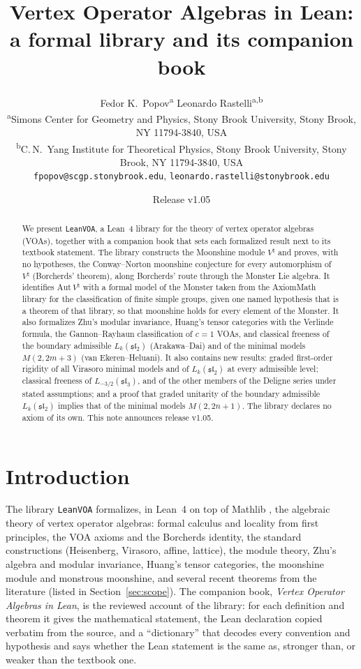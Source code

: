 \documentclass[10pt]{article}
\title{Vertex Operator Algebras in Lean:\\ a formal library and its companion book}
\author{Fedor K.\ Popov\textsuperscript{a} \quad Leonardo Rastelli\textsuperscript{a,b}\\[0.8em]
  \small\textsuperscript{a}Simons Center for Geometry and Physics, Stony Brook University, Stony Brook, NY 11794-3840, USA\\
  \small\textsuperscript{b}C.\,N.\ Yang Institute for Theoretical Physics, Stony Brook University, Stony Brook, NY
  11794-3840, USA\\[0.5em]
  \small\texttt{fpopov@scgp.stonybrook.edu}, \texttt{leonardo.rastelli@stonybrook.edu}}
\date{Release v1.05}
\newcommand{\sltwo}{\mathfrak{sl}_2}
\newcommand{\slthree}{\mathfrak{sl}_3}
\begin{document}
\maketitle

\begin{abstract}
  We present \texttt{LeanVOA}, a Lean~4 library for the theory of vertex operator algebras (VOAs), together with a
  companion book that sets each formalized result next to its textbook statement. The library constructs the
  Moonshine module $V^\natural$ and proves, with no hypotheses, the Conway--Norton moonshine conjecture for every
  automorphism of $V^\natural$ (Borcherds' theorem), along Borcherds' route through the Monster Lie algebra. It
  identifies $\mathrm{Aut}\,V^\natural$ with a formal model of the Monster taken from the AxiomMath library for the
  classification of finite simple groups, given one named hypothesis that is a theorem of that library, so that
  moonshine holds for every element of the Monster. It also formalizes Zhu's modular invariance, Huang's tensor
  categories with the Verlinde formula, the Gannon--Rayhaun classification of $c=1$ VOAs, and classical freeness of the boundary admissible
  $L_k(\sltwo)$ (Arakawa--Dai) and of the minimal models $M(2,2m+3)$ (van Ekeren--Heluani). It also contains new
  results: graded first-order rigidity of all Virasoro minimal models and of $L_k(\sltwo)$ at every admissible level; classical freeness of $L_{-3/2}(\slthree)$, and of the other members of the Deligne series under stated
  assumptions; and a proof that graded
  unitarity of the boundary admissible $L_k(\sltwo)$ implies that of the minimal models $M(2,2n+1)$. The library
  declares no axiom of its own. This note announces release v1.05.
\end{abstract}

\section{Introduction}

The library \texttt{LeanVOA} formalizes, in Lean~4 \cite{lean4} on top of Mathlib \cite{mathlib}, the algebraic
theory of vertex operator algebras: formal calculus and locality from first principles, the VOA axioms
and the Borcherds identity, the standard constructions (Heisenberg, Virasoro, affine, lattice), the module theory,
Zhu's algebra and modular invariance, Huang's tensor categories, the moonshine module and monstrous moonshine,
and several recent theorems from the literature (listed in Section~\ref{sec:scope}). The companion book, \emph{Vertex Operator Algebras in Lean}, is the
reviewed account of the library: for each definition and theorem it gives the mathematical statement, the Lean
declaration copied verbatim from the source, and a ``dictionary'' that decodes every convention and hypothesis
and says whether the Lean statement is the same as, stronger than, or weaker than the textbook one.
\end{document}

